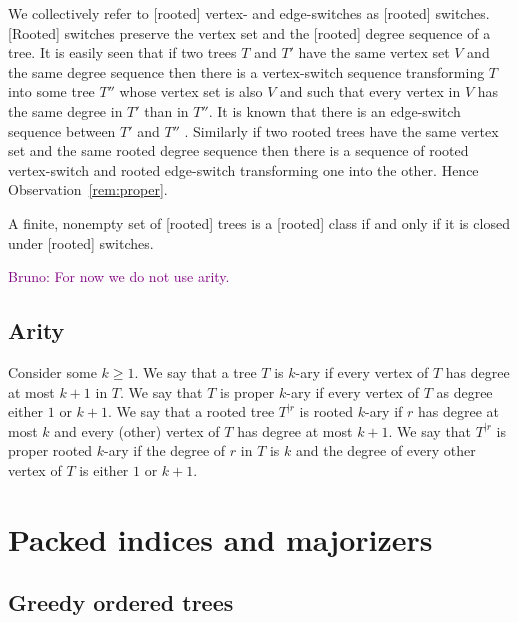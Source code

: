 \documentclass[11 pt]{modarticle}
\newcommand{\rtree}[2]{{#1}^{\lvert #2}}
\newcommand{\tclass}{\mathcal{C}}
\newcommand{\rtclass}{\mathcal{R}}
\newcommand{\bldcomment}[1]{\textcolor{purple}{{\footnotesize Bruno:} #1}}
\begin{document}
We collectively refer to [rooted] vertex- and edge-switches as [rooted] switches. [Rooted] switches preserve the vertex set and the [rooted] degree sequence of a tree. It is easily seen that if two trees $T$ and $T'$ have the same vertex set $V$ and the same degree sequence then there is a vertex-switch sequence transforming $T$ into some tree $T''$ whose vertex set is also $V$ and such that every vertex in $V$ has the same degree in $T'$ than in $T''$. It is known that there is an edge-switch sequence between $T'$ and $T''$ \cite[Theorem~4.3]{switch}. Similarly if two rooted trees have the same vertex set and the same rooted degree sequence then there is a sequence of rooted vertex-switch and rooted edge-switch transforming one into the other. Hence Observation~\ref{rem:proper}.

\begin{rem}\label{rem:proper}
A finite, nonempty set of [rooted] trees is a [rooted] class if and only if it is closed under [rooted] switches.
\end{rem}

\bldcomment{For now we do not use arity.}
\subsection{Arity}

Consider some $k \geq 1$. We say that a tree $T$ is $k$-ary if every vertex of $T$ has degree at most $k+1$ in $T$. We say that $T$ is proper $k$-ary if every vertex of $T$ as degree either $1$ or $k+1$. We say that a rooted tree $\rtree{T}{r}$ is rooted $k$-ary if $r$ has degree at most $k$ and every (other) vertex of $T$ has degree at most $k+1$. We say that $\rtree{T}{r}$ is proper rooted $k$-ary if the degree of $r$ in $T$ is $k$ and the degree of every other vertex of $T$ is either $1$ or $k+1$. 


\section{Packed indices and majorizers}

\subsection{Greedy ordered trees}
\end{document}
